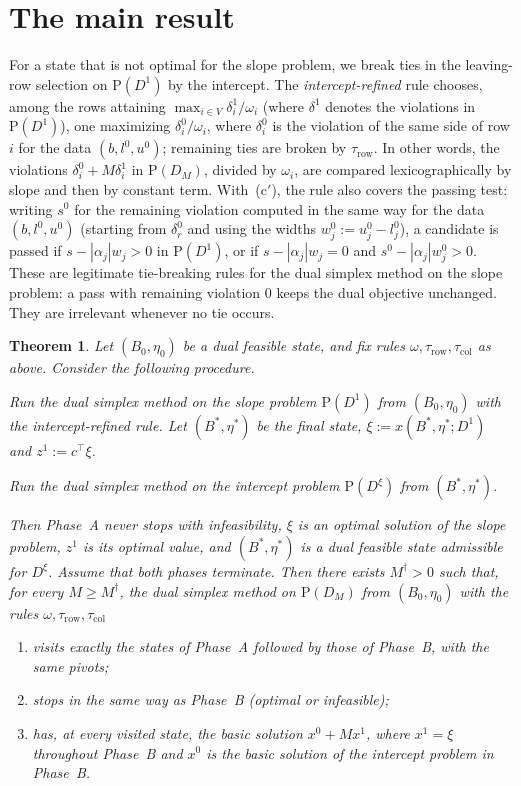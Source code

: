 \documentclass[11pt,a4paper]{article}
\theoremstyle{plain}
\newtheorem{theorem}{Theorem}
\theoremstyle{definition}
\theoremstyle{remark}
\newcommand{\Pb}{\mathrm{P}}
\begin{document}
\section{The main result}
\label{sec:main}

For a state that is not optimal for the slope problem, we break ties in the leaving-row selection on $\Pb(D^1)$ by the intercept. The \emph{intercept-refined} rule chooses, among the rows attaining $\max_{i\in V}\delta_i^1/\omega_i$ (where $\delta^1$ denotes the violations in $\Pb(D^1)$), one maximizing $\delta_i^0/\omega_i$, where $\delta_i^0$ is the violation of the same side of row $i$ for the data $(b,l^0,u^0)$; remaining ties are broken by $\tau_{\mathrm{row}}$. In other words, the violations $\delta^0_i+M\delta^1_i$ in $\Pb(D_M)$, divided by $\omega_i$, are compared lexicographically by slope and then by constant term. With~(c$'$), the rule also covers the passing test: writing $s^0$ for the remaining violation computed in the same way for the data $(b,l^0,u^0)$ (starting from $\delta^0_r$ and using the widths $w^0_j:=u^0_j-l^0_j$), a candidate is passed if $s-|\alpha_j|w_j>0$ in $\Pb(D^1)$, or if $s-|\alpha_j|w_j=0$ and $s^0-|\alpha_j|w^0_j>0$. These are legitimate tie-breaking rules for the dual simplex method on the slope problem: a pass with remaining violation $0$ keeps the dual objective unchanged. They are irrelevant whenever no tie occurs.

\begin{theorem}
\label{thm:main}
Let $(B_0,\eta_0)$ be a dual feasible state, and fix rules $\omega,\tau_{\mathrm{row}},\tau_{\mathrm{col}}$ as above. Consider the following procedure.
\begin{description}[leftmargin=1em]
\item[Phase A.] Run the dual simplex method on the slope problem $\Pb(D^1)$ from $(B_0,\eta_0)$ with the intercept-refined rule. Let $(B^\ast,\eta^\ast)$ be the final state, $\xi:=x(B^\ast,\eta^\ast;D^1)$ and $z^1:=c^\top\xi$.
\item[Phase B.] Run the dual simplex method on the intercept problem $\Pb(D^\xi)$ from $(B^\ast,\eta^\ast)$.
\end{description}
Then Phase~A never stops with infeasibility, $\xi$ is an optimal solution of the slope problem, $z^1$ is its optimal value, and $(B^\ast,\eta^\ast)$ is a dual feasible state admissible for $D^\xi$. Assume that both phases terminate. Then there exists $M^\dagger>0$ such that, for every $M\ge M^\dagger$, the dual simplex method on $\Pb(D_M)$ from $(B_0,\eta_0)$ with the rules $\omega,\tau_{\mathrm{row}},\tau_{\mathrm{col}}$
\begin{enumerate}[label=(\roman*)]
\item visits exactly the states of Phase~A followed by those of Phase~B, with the same pivots;
\item stops in the same way as Phase~B (optimal or infeasible);
\item has, at every visited state, the basic solution $x^0+Mx^1$, where $x^1=\xi$ throughout Phase~B and $x^0$ is the basic solution of the intercept problem in Phase~B.
\end{enumerate}
\end{theorem}
\end{document}
